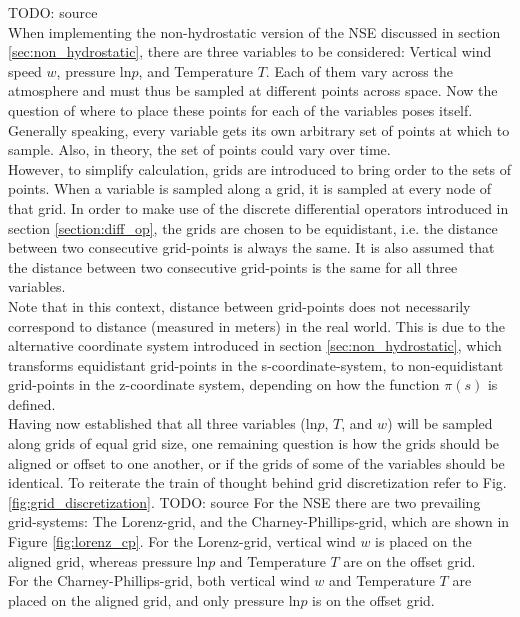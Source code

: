 TODO: source\\
When implementing the non-hydrostatic version of the NSE discussed in section \ref{sec:non_hydrostatic}, there are three variables to be considered: Vertical wind speed $w$, pressure $\text{ln}p$, and Temperature $T$.
Each of them vary across the atmosphere and must thus be sampled at different points across space.
Now the question of where to place these points for each of the variables poses itself.\\
Generally speaking, every variable gets its own arbitrary set of points at which to sample.
Also, in theory, the set of points could vary over time.\\
However, to simplify calculation, grids are introduced to bring order to the sets of points.
When a variable is sampled along a grid, it is sampled at every node of that grid.
In order to make use of the discrete differential operators introduced in section \ref{section:diff_op}, the grids are chosen to be equidistant, i.e. the distance between two consecutive grid-points is always the same.
It is also assumed that the distance between two consecutive grid-points is the same for all three variables.\\
Note that in this context, distance between grid-points does not necessarily correspond to distance (measured in meters) in the real world.
This is due to the alternative coordinate system introduced in section \ref{sec:non_hydrostatic}, which transforms equidistant grid-points in the s-coordinate-system, to non-equidistant grid-points in the z-coordinate system, depending on how the function $\pi(s)$ is defined.
\\
Having now established that all three variables ($\text{ln}p$, $T$, and $w$) will be sampled along grids of equal grid size, one remaining question is how the grids should be aligned or offset to one another, or if the grids of some of the variables should be identical.
To reiterate the train of thought behind grid discretization refer to Fig. \ref{fig:grid_discretization}.
TODO: source
For the NSE there are two prevailing grid-systems: The Lorenz-grid, and the Charney-Phillips-grid, which are shown in Figure \ref{fig:lorenz_cp}.
For the Lorenz-grid, vertical wind $w$ is placed on the aligned grid, whereas pressure $\text{ln}p$ and Temperature $T$ are on the offset grid.\\
For the Charney-Phillips-grid, both vertical wind $w$ and Temperature $T$ are placed on the aligned grid, and only pressure $\text{ln}p$ is on the offset grid.\\
